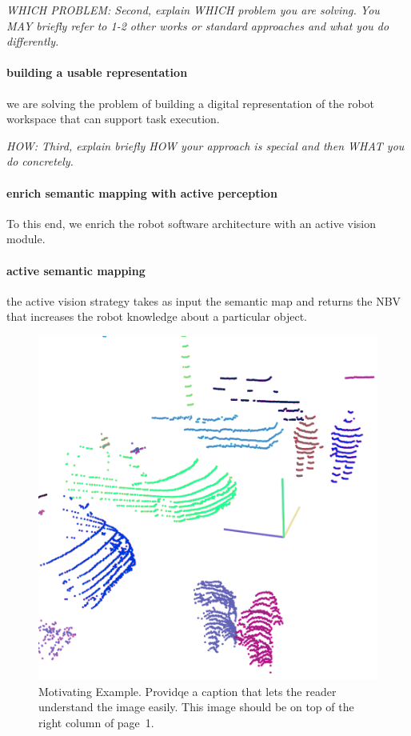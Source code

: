 \documentclass[letterpaper, 10 pt, conference]{ieeeconf}  %
\begin{document}
	

{\color{blue}\emph{WHICH PROBLEM: Second, explain WHICH problem you are solving. You MAY briefly 
 refer to 1-2 other works or standard approaches and what you do differently.}}

\paragraph{building a usable representation} we are solving the problem of building a digital representation of the robot workspace that can support task execution.

{\color{blue}\emph{HOW: Third, explain briefly HOW your approach is special and then WHAT 
you do concretely.} }

\paragraph{enrich semantic mapping with active perception} To this end, we enrich the robot software architecture with an active vision module.

\paragraph{active semantic mapping} the active vision strategy takes as input the semantic map and returns the NBV that increases the robot knowledge about a particular object.

\begin{figure}[t]
  \centering
 \includegraphics[width=0.99\linewidth]{pics/motivation}
 \caption{Motivating Example. Providqe a caption that lets the reader
   understand the image easily.  This image should be on top of the
   right column of page~1.}
  \label{fig:motivation}
\end{figure}
\end{document}
